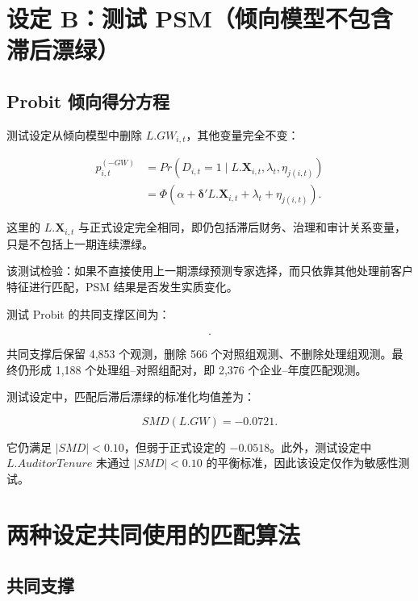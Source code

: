 \documentclass[12pt,a4paper]{article}
\begin{document}
\section{设定 B：测试 PSM（倾向模型不包含滞后漂绿）}

\subsection{Probit 倾向得分方程}

测试设定从倾向模型中删除 $L.GW_{i,t}$，其他变量完全不变：

\begin{equation}
\begin{aligned}
    p^{(-GW)}_{i,t}
    &=Pr\left(D_{i,t}=1\mid L.\mathbf{X}_{i,t},\lambda_t,\eta_{j(i,t)}\right)\\
    &=\Phi\left(
    \alpha+
    \boldsymbol{\delta}'L.\mathbf{X}_{i,t}+
    \lambda_t+
    \eta_{j(i,t)}
    \right).
\end{aligned}
\end{equation}

这里的 $L.\mathbf{X}_{i,t}$ 与正式设定完全相同，即仍包括滞后财务、治理和审计关系变量，只是不包括上一期连续漂绿。

该测试检验：如果不直接使用上一期漂绿预测专家选择，而只依靠其他处理前客户特征进行匹配，PSM 结果是否发生实质变化。

测试 Probit 的共同支撑区间为：

\begin{equation}
    [0.0200,\ 0.8542].
\end{equation}

共同支撑后保留 4,853 个观测，删除 566 个对照组观测、不删除处理组观测。最终仍形成 1,188 个处理组--对照组配对，即 2,376 个企业--年度匹配观测。

测试设定中，匹配后滞后漂绿的标准化均值差为：

\begin{equation}
    SMD(L.GW)=-0.0721.
\end{equation}

它仍满足 $|SMD|<0.10$，但弱于正式设定的 $-0.0518$。此外，测试设定中 $L.AuditorTenure$ 未通过 $|SMD|<0.10$ 的平衡标准，因此该设定仅作为敏感性测试。

\section{两种设定共同使用的匹配算法}

\subsection{共同支撑}
\end{document}
